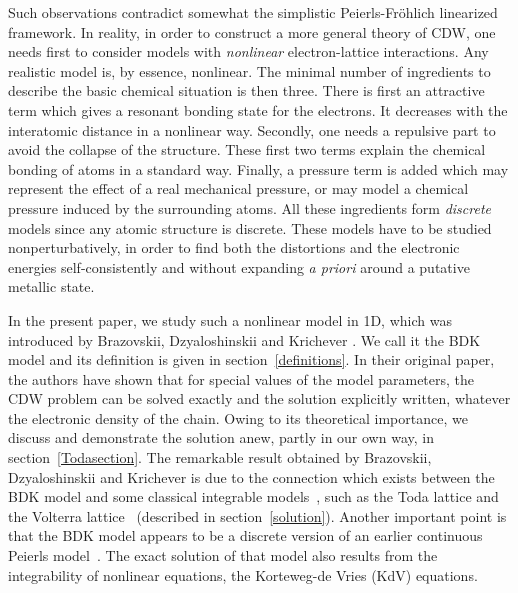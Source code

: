 \documentclass[]{revtex4-1}
\begin{document}
Such observations contradict somewhat the simplistic
Peierls-Fr\"ohlich linearized framework. In reality, in order to
construct a more general theory of CDW, one needs first to consider
models with \textit{nonlinear} electron-lattice interactions. 
Any realistic model is, by essence, nonlinear. The minimal number of
ingredients to describe the basic chemical situation is then
three. There is first an attractive term which gives a resonant
bonding state for the electrons. It decreases with the interatomic
distance in a nonlinear way.  Secondly, one needs a repulsive part to
avoid the collapse of the structure. These first two terms explain the
chemical bonding of atoms in a standard way. Finally, a pressure term is added
which may represent the effect of a real mechanical pressure, or may
model a chemical pressure induced by the surrounding atoms. All these
ingredients form \textit{discrete} models since any atomic structure
is discrete. These models have to be studied nonperturbatively, in
order to find both the distortions and the electronic energies
self-consistently and without expanding \textit{a priori} around a
putative metallic state.

In the present paper, we study such a nonlinear model in 1D,
which was introduced by Brazovskii, Dzyaloshinskii and Krichever
\cite{BDK}. We call it the BDK model and its definition is given in
section~\ref{definitions}.  In their original paper, the authors have shown
that for special values of the model parameters, the CDW
problem can be solved exactly and the solution explicitly written,
whatever the electronic density of the chain. Owing to its theoretical importance, we discuss and demonstrate the
solution anew, partly in our own way, in section~\ref{Todasection}. The remarkable result obtained by Brazovskii, Dzyaloshinskii and Krichever is due
to the connection which exists between the BDK model and some classical integrable models~\cite{Babelon,Dubrovin}, such
as the Toda lattice \cite{Toda,Todabook} and the Volterra lattice~\cite{Moser} (described in section~\ref{solution}).
Another important point is that the BDK model appears to be a
discrete version of an earlier continuous Peierls
model~\cite{Belokolos}. The exact solution of that model also results from the integrability
of nonlinear equations, the Korteweg-de Vries (KdV) equations.
\end{document}
